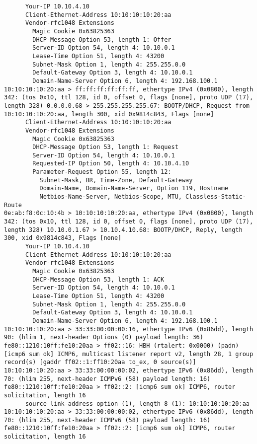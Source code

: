 \documentclass[a4paper,12pt]{article}
\begin{document}
\begin{Verbatim}
	  Your-IP 10.10.4.10
	  Client-Ethernet-Address 10:10:10:10:20:aa
	  Vendor-rfc1048 Extensions
	    Magic Cookie 0x63825363
	    DHCP-Message Option 53, length 1: Offer
	    Server-ID Option 54, length 4: 10.10.0.1
	    Lease-Time Option 51, length 4: 43200
	    Subnet-Mask Option 1, length 4: 255.255.0.0
	    Default-Gateway Option 3, length 4: 10.10.0.1
	    Domain-Name-Server Option 6, length 4: 192.168.100.1
10:10:10:10:20:aa > ff:ff:ff:ff:ff:ff, ethertype IPv4 (0x0800), length 342: (tos 0x10, ttl 128, id 0, offset 0, flags [none], proto UDP (17), length 328) 0.0.0.0.68 > 255.255.255.255.67: BOOTP/DHCP, Request from 10:10:10:10:20:aa, length 300, xid 0x9814c843, Flags [none]
	  Client-Ethernet-Address 10:10:10:10:20:aa
	  Vendor-rfc1048 Extensions
	    Magic Cookie 0x63825363
	    DHCP-Message Option 53, length 1: Request
	    Server-ID Option 54, length 4: 10.10.0.1
	    Requested-IP Option 50, length 4: 10.10.4.10
	    Parameter-Request Option 55, length 12: 
	      Subnet-Mask, BR, Time-Zone, Default-Gateway
	      Domain-Name, Domain-Name-Server, Option 119, Hostname
	      Netbios-Name-Server, Netbios-Scope, MTU, Classless-Static-Route
0e:ab:f8:0c:10:4b > 10:10:10:10:20:aa, ethertype IPv4 (0x0800), length 342: (tos 0x10, ttl 128, id 0, offset 0, flags [none], proto UDP (17), length 328) 10.10.0.1.67 > 10.10.4.10.68: BOOTP/DHCP, Reply, length 300, xid 0x9814c843, Flags [none]
	  Your-IP 10.10.4.10
	  Client-Ethernet-Address 10:10:10:10:20:aa
	  Vendor-rfc1048 Extensions
	    Magic Cookie 0x63825363
	    DHCP-Message Option 53, length 1: ACK
	    Server-ID Option 54, length 4: 10.10.0.1
	    Lease-Time Option 51, length 4: 43200
	    Subnet-Mask Option 1, length 4: 255.255.0.0
	    Default-Gateway Option 3, length 4: 10.10.0.1
	    Domain-Name-Server Option 6, length 4: 192.168.100.1
10:10:10:10:20:aa > 33:33:00:00:00:16, ethertype IPv6 (0x86dd), length 90: (hlim 1, next-header Options (0) payload length: 36) fe80::1210:10ff:fe10:20aa > ff02::16: HBH (rtalert: 0x0000) (padn)[icmp6 sum ok] ICMP6, multicast listener report v2, length 28, 1 group record(s) [gaddr ff02::1:ff10:20aa to_ex, 0 source(s)]
10:10:10:10:20:aa > 33:33:00:00:00:02, ethertype IPv6 (0x86dd), length 70: (hlim 255, next-header ICMPv6 (58) payload length: 16) fe80::1210:10ff:fe10:20aa > ff02::2: [icmp6 sum ok] ICMP6, router solicitation, length 16
	  source link-address option (1), length 8 (1): 10:10:10:10:20:aa
10:10:10:10:20:aa > 33:33:00:00:00:02, ethertype IPv6 (0x86dd), length 70: (hlim 255, next-header ICMPv6 (58) payload length: 16) fe80::1210:10ff:fe10:20aa > ff02::2: [icmp6 sum ok] ICMP6, router solicitation, length 16

\end{Verbatim}
\end{document}
